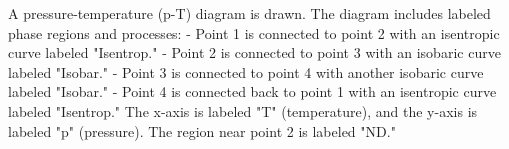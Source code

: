 A pressure-temperature (p-T) diagram is drawn. The diagram includes labeled phase regions and processes:  
- Point 1 is connected to point 2 with an isentropic curve labeled "Isentrop."  
- Point 2 is connected to point 3 with an isobaric curve labeled "Isobar."  
- Point 3 is connected to point 4 with another isobaric curve labeled "Isobar."  
- Point 4 is connected back to point 1 with an isentropic curve labeled "Isentrop."  
The x-axis is labeled "T" (temperature), and the y-axis is labeled "p" (pressure).  
The region near point 2 is labeled "ND."